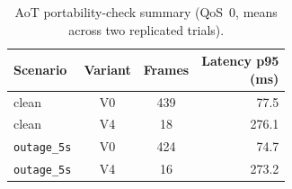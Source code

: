 \begin{table}[t]
\centering
\caption{AoT portability-check summary (QoS~0, means across two replicated trials).}
\label{tab:aot-summary}
\scriptsize
\setlength{\tabcolsep}{4pt}
\renewcommand{\arraystretch}{1.03}
\begin{adjustbox}{max width=\columnwidth}
\begin{tabular}{@{}lccr@{}}
\toprule
Scenario & Variant & Frames & \makecell[r]{Latency p95\\(ms)} \\
\midrule
clean & V0 & 439 & 77.5 \\
clean & V4 & 18 & 276.1 \\
\nolinkurl{outage_5s} & V0 & 424 & 74.7 \\
\nolinkurl{outage_5s} & V4 & 16 & 273.2 \\
\bottomrule
\end{tabular}
\end{adjustbox}
\end{table}
